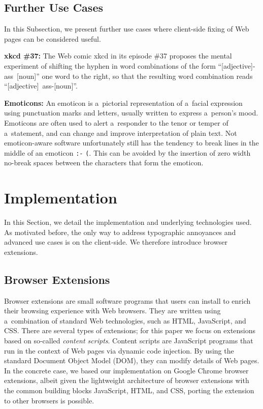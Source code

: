 \documentclass{sig-alternate}
\let\oldemph\emph
\renewcommand{\emph}[1]{\oldemph{\fontsize{9}{9}\selectfont #1}}
\begin{document}
\subsection{Further Use Cases}
In this Subsection, we present further use cases where client-side fixing of Web pages can be considered useful.

\textbf{xkcd \#37:} The Web comic xkcd in its episode \#37 proposes the mental experiment of shifting the hyphen in word combinations of the form \mbox{``[adjective]-ass [noun]''} one word to the right,
so that the resulting word combination reads \mbox{``[adjective] ass-[noun]''}.

\textbf{Emoticons:} An emoticon is a~pictorial representation of a~facial expression using punctuation marks and letters,
usually written to express a~person's mood.
Emoticons are often used to alert a~responder to the tenor or temper of a~statement,
and can change and improve interpretation of plain text.
Not emoticon-aware software unfortunately still has the tendency to break lines in the middle of an emoticon \texttt{:-} \linebreak %
\texttt{(}. This can be avoided by the insertion of zero width no-break spaces between the characters that form the emoticon.

\section{Implementation}
In this Section, we detail the implementation and underlying technologies used.
As motivated before, the only way to address typographic annoyances and advanced use cases is on the client-side.
We therefore introduce browser extensions.

\subsection{Browser Extensions}
Browser extensions are small software programs that users can install to enrich their browsing experience with Web browsers.
They are written using a~combination of standard Web technologies, such as HTML, JavaScript, and CSS.
There are several types of extensions; for this paper we focus on extensions based on so-called \emph{content scripts}.
Content scripts are JavaScript programs that run in the context of Web pages via dynamic code injection.
By using the standard Document Object Model (DOM), they can modify details of Web pages.
In the concrete case, we based our implementation on Google Chrome browser extensions\footnotemark[1],
albeit given the lightweight architecture of browser extensions
with the common building blocks JavaScript, HTML, and CSS,
porting the extension to other browsers is possible.
\end{document}
